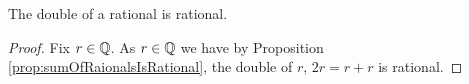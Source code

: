 \guard




\begin{prop}
\label{prop:doubleOfRationalIsRational}
  The double of a rational is rational.
\end{prop}
\begin{proof}
  Fix $r\in\mathbb{Q}$.
  As $r\in\mathbb{Q}$ we have by Proposition \ref{prop:sumOfRaionalsIsRational}, the double of $r$, $2r=r+r$ is rational.
\end{proof}
